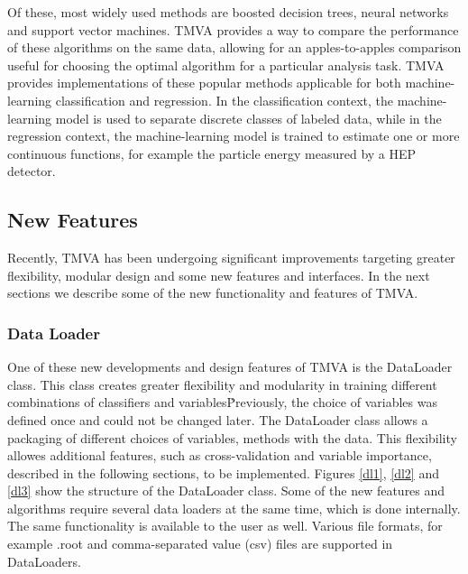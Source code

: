 \documentclass[a4paper]{jpconf}
\begin{document}
Of these, most widely used methods are boosted decision trees, neural networks and support vector machines. TMVA provides a way to compare the performance of these algorithms on the same data, allowing for an apples-to-apples comparison useful for choosing the optimal algorithm for a particular analysis task. TMVA provides implementations of these popular methods applicable for both machine-learning classification and regression. In the classification context, the machine-learning model is used to separate discrete classes of labeled data, while in the regression context, the machine-learning model is trained to estimate one or more continuous functions, for example the particle energy measured by a HEP detector.



\subsection{New Features}
Recently, TMVA has  been undergoing significant improvements targeting greater flexibility, modular design and some new features and interfaces. In the next sections we describe some of the new functionality and features of TMVA.

\subsubsection{Data Loader}
One of these new developments and design features of TMVA is the DataLoader class. This class creates greater flexibility and modularity in training different combinations of classifiers and variables\. Previously, the choice of variables was defined once and could not be changed later. The DataLoader class allows a packaging of different choices of variables, methods with the data. This flexibility allowes additional features, such as cross-validation and variable importance, described in the following sections, to be implemented.
Figures \ref{dl1}, \ref{dl2} and \ref{dl3} show the structure of the DataLoader class. Some of the new features and algorithms require several data loaders at the same time, which is done internally. The same functionality is available to the user as well. Various file formats, for example .root and comma-separated value (csv) files are supported in DataLoaders.
\end{document}
